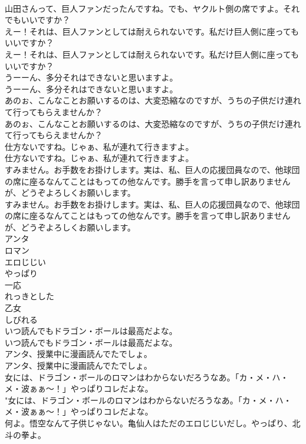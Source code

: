 \documentclass[8pt]{extreport}
\begin{document}
\begin{CJK}{UTF8}{min}
\\	山田さんって、巨人ファンだったんですね。でも、ヤクルト側の席ですよ。それでもいいですか？ 
\\	えー！それは、巨人ファンとしては耐えられないです。私だけ巨人側に座ってもいいですか？	
\\	えー！それは、巨人ファンとしては耐えられないです。私だけ巨人側に座ってもいいですか？ 
\\	うーーん、多分それはできないと思いますよ。	
\\	うーーん、多分それはできないと思いますよ。 
\\	あのぉ、こんなことお願いするのは、大変恐縮なのですが、うちの子供だけ連れて行ってもらえませんか？	
\\	あのぉ、こんなことお願いするのは、大変恐縮なのですが、うちの子供だけ連れて行ってもらえませんか？ 
\\	仕方ないですね。じゃぁ、私が連れて行きますよ。	
\\	仕方ないですね。じゃぁ、私が連れて行きますよ。 
\\	すみません。お手数をお掛けします。実は、私、巨人の応援団員なので、他球団の席に座るなんてことはもっての他なんです。勝手を言って申し訳ありませんが、どうぞよろしくお願いします。	
\\	すみません。お手数をお掛けします。実は、私、巨人の応援団員なので、他球団の席に座るなんてことはもっての他なんです。勝手を言って申し訳ありませんが、どうぞよろしくお願いします。 
\\	アンタ
\\	ロマン
\\	エロじじい
\\	やっぱり
\\	一応
\\	れっきとした
\\	乙女
\\	しびれる
\\	いつ読んでもドラゴン・ボールは最高だよな。	
\\	いつ読んでもドラゴン・ボールは最高だよな。 
\\	アンタ、授業中に漫画読んでたでしょ。	
\\	アンタ、授業中に漫画読んでたでしょ。 
\\	女には、ドラゴン・ボールのロマンはわからないだろうなあ。「カ・メ・ハ・メ・波ぁぁ～！」やっぱりコレだよな。	
\\	"女には、ドラゴン・ボールのロマンはわからないだろうなあ。「カ・メ・ハ・メ・波ぁぁ～！」やっぱりコレだよな。 
\\	何よ。悟空なんて子供じゃない。亀仙人はただのエロじじいだし。やっぱり、北斗の拳よ。	

\end{CJK}
\end{document}
